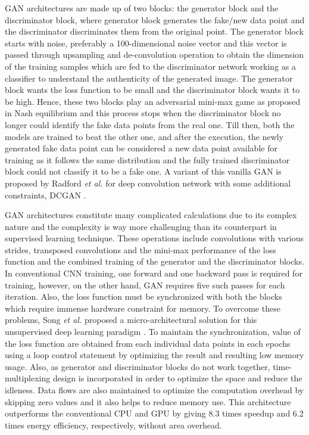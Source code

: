 \documentclass[journal]{IEEEtran}
\begin{document}
\par GAN architectures are made up of two blocks: the generator block and the discriminator block, where generator block generates the fake/new data point and the discriminator discriminates them from the original point. The generator block starts with noise, preferably a 100-dimensional noise vector and this vector is passed through upsampling and de-convolution operation to  obtain the dimension of the training samples which are fed to the discriminator network working as a classifier to understand the authenticity of the generated image. The generator block wants the loss function to be small and the discriminator block wants it to be high. Hence, these two blocks play an adversarial mini-max game as proposed in Nash equilibrium and this process stops when the discriminator block no longer could identify the fake data points from the real one. Till then, both the models are trained to beat the other one, and after the execution, the newly generated fake data point can be considered a new data point available for training as it follows the same distribution and the fully trained discriminator block could not classify it to be a fake one. A variant of this vanilla GAN is proposed by Radford \textit{et al.} for deep convolution network with some additional constraints, DCGAN \cite{paper34}. 

\par GAN architectures constitute many complicated calculations due to its complex nature and the complexity is way more challenging than its counterpart in supervised learning technique. These operations include convolutions with various strides, transposed convolutions and the mini-max performance of the loss function and the combined training of the generator and the discriminator blocks. In conventional CNN training, one forward and one backward pass is required for training, however, on the other hand, GAN requires five such passes for each iteration. Also, the loss function must be synchronized with both the blocks which require immense hardware constraint for memory. To overcome these problems, Song \textit{et al.} proposed a micro-architectural solution for this unsupervised deep learning paradigm \cite{paper35}. To maintain the synchronization, value of the loss function are obtained from each individual data points in each epochs using a loop control statement by optimizing the result and resulting low memory usage. Also, as generator and discriminator blocks do not work together, time-multiplexing design is incorporated in order to optimize the space and reduce the idleness. Data flows are also maintained to optimize the computation overhead by skipping zero values and it also helps to reduce memory use. This architecture outperforms the conventional CPU and GPU by giving 8.3 times speedup and 6.2 times energy efficiency, respectively, without area overhead. 
\end{document}
